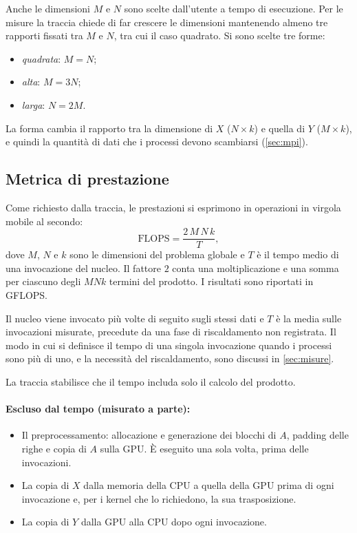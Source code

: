 \documentclass[11pt,a4paper]{article}
\begin{document}
Anche le dimensioni $M$ e $N$ sono scelte dall'utente a tempo di esecuzione.
Per le misure la traccia chiede di far crescere le dimensioni mantenendo
almeno tre rapporti fissati tra $M$ e $N$, tra cui il caso quadrato. Si sono
scelte tre forme:
\begin{itemize}
  \item \emph{quadrata}: $M = N$;
  \item \emph{alta}: $M = 3N$;
  \item \emph{larga}: $N = 2M$.
\end{itemize}
La forma cambia il rapporto tra la dimensione di $X$ ($N \times k$) e quella
di $Y$ ($M \times k$), e quindi la quantità di dati che i processi devono
scambiarsi (\cref{sec:mpi}).

\subsection{Metrica di prestazione}\label{sec:metrica}

Come richiesto dalla traccia, le prestazioni si esprimono in operazioni in
virgola mobile al secondo:
\[
  \text{FLOPS} = \frac{2\,M\,N\,k}{T},
\]
dove $M$, $N$ e $k$ sono le dimensioni del problema globale e $T$ è il tempo
medio di una invocazione del nucleo. Il fattore $2$ conta una moltiplicazione e
una somma per ciascuno degli $M N k$ termini del prodotto. I risultati sono
riportati in GFLOPS.

Il nucleo viene invocato più volte di seguito sugli stessi dati e $T$ è la
media sulle invocazioni misurate, precedute da una fase di riscaldamento non
registrata. Il modo in cui si definisce il tempo di una singola invocazione
quando i processi sono più di uno, e la necessità del riscaldamento, sono
discussi in \cref{sec:misure}.

La traccia stabilisce che il tempo includa solo il calcolo del prodotto.

\paragraph{Escluso dal tempo (misurato a parte):}
\begin{itemize}
  \item Il preprocessamento: allocazione e generazione dei blocchi di $A$,
        padding delle righe e copia di $A$ sulla GPU. È eseguito una sola
        volta, prima delle invocazioni.
  \item La copia di $X$ dalla memoria della CPU a quella della GPU prima di
        ogni invocazione e, per i kernel che lo richiedono, la sua
        trasposizione.
  \item La copia di $Y$ dalla GPU alla CPU dopo ogni invocazione.
\end{itemize}
\end{document}
